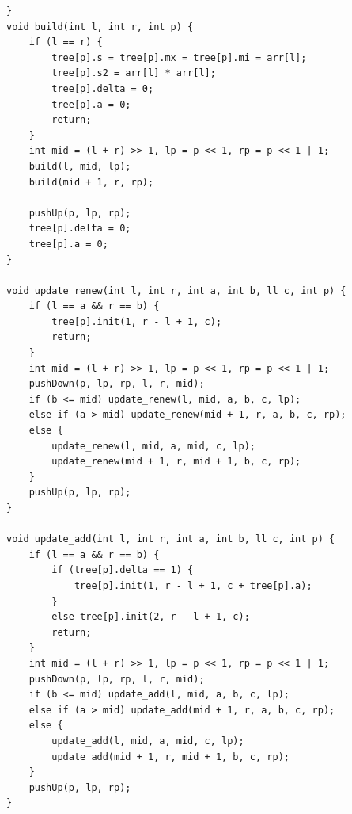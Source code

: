 \documentclass[a4paper]{article}
\begin{document}
\begin{CJK*}{UTF8}{gbsn}
\begin{multicols}{3}
\begin{flushleft}
\begin{lstlisting}
}
void build(int l, int r, int p) {
    if (l == r) {
        tree[p].s = tree[p].mx = tree[p].mi = arr[l];
        tree[p].s2 = arr[l] * arr[l];
        tree[p].delta = 0;
        tree[p].a = 0;
        return;
    }
    int mid = (l + r) >> 1, lp = p << 1, rp = p << 1 | 1;
    build(l, mid, lp);
    build(mid + 1, r, rp);

    pushUp(p, lp, rp);
    tree[p].delta = 0;
    tree[p].a = 0;
}

void update_renew(int l, int r, int a, int b, ll c, int p) {
    if (l == a && r == b) {
        tree[p].init(1, r - l + 1, c);
        return;
    }
    int mid = (l + r) >> 1, lp = p << 1, rp = p << 1 | 1;
    pushDown(p, lp, rp, l, r, mid);
    if (b <= mid) update_renew(l, mid, a, b, c, lp);
    else if (a > mid) update_renew(mid + 1, r, a, b, c, rp);
    else {
        update_renew(l, mid, a, mid, c, lp);
        update_renew(mid + 1, r, mid + 1, b, c, rp);
    }
    pushUp(p, lp, rp);
}

void update_add(int l, int r, int a, int b, ll c, int p) {
    if (l == a && r == b) {
        if (tree[p].delta == 1) {
            tree[p].init(1, r - l + 1, c + tree[p].a);
        }
        else tree[p].init(2, r - l + 1, c);
        return;
    }
    int mid = (l + r) >> 1, lp = p << 1, rp = p << 1 | 1;
    pushDown(p, lp, rp, l, r, mid);
    if (b <= mid) update_add(l, mid, a, b, c, lp);
    else if (a > mid) update_add(mid + 1, r, a, b, c, rp);
    else {
        update_add(l, mid, a, mid, c, lp);
        update_add(mid + 1, r, mid + 1, b, c, rp);
    }
    pushUp(p, lp, rp);
}


\end{lstlisting}
\end{flushleft}
\end{multicols}
\end{CJK*}
\end{document}
